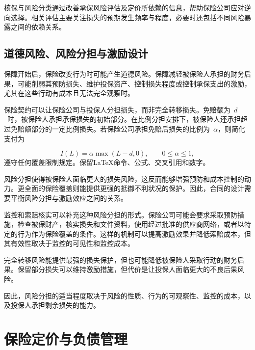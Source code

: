 核保与风险分类通过改善承保风险评估及定价所依赖的信息，帮助保险公司应对逆向选择。相关评估主要关注损失的预期发生频率与程度，必要时还包括不同风险暴露之间的依赖关系。

\subsection{道德风险、风险分担与激励设计}

保障开始后，保险改变行为时可能产生道德风险。保障减轻被保险人承担的财务后果，可能削弱其预防损失、维护投保资产、控制损失程度或控制承保支出的激励，尤其在这些行动有成本且无法完全观察时。

保险契约可以让保险公司与投保人分担损失，而非完全转移损失。免赔额为~$d$~时，被保险人承担承保损失的初始部分。在比例分担安排下，被保险人还承担超过免赔额部分的一定比例损失。若保险公司承担免赔后损失的比例为~$\alpha$，则简化支付为


\begin{equation}
I(L)
=\alpha\max(L-d,0),
\qquad 0\leq\alpha\leq 1,
\label{eq:ch15-coinsurance-payoff}
\end{equation}
遵守任何覆盖限制规定。保留LaTeX命令、公式、交叉引用和数字。

风险分担使得被保险人面临更大的损失风险，这反而能够增强预防和成本控制的动力。更全面的保险覆盖则能提供更强的抵御不利状况的保护。因此，合同的设计需要平衡风险分担与激励效应之间的关系。

监控和索赔核实可以补充这种风险分担的形式。保险公司可能会要求采取预防措施，检查被保财产，核实损失和文件资料，使用经过批准的供应商网络，或者以特定的行为作为保险覆盖的条件。这样的机制可以提高激励效果并降低索赔成本，但其有效性取决于监控的可见性和监控成本。

\begin{tcolorbox}[
enhanced,
breakable,
colback=white,
colframe=FinanceBlue,
boxrule=0.7pt,
sharp corners,
borderline west={2.2pt}{0pt}{FinanceBlue},
title=\textbf{财务前景：报道的广度可能会削弱激励措施的效果。},
coltitle=white,
colbacktitle=FinanceBlue,
fonttitle=\bfseries,
before skip=1.2em,
after skip=1.2em
]

完全转移风险能提供最强的损失保护，但也可能降低被保险人采取行动的财务后果。保留部分损失可以维持激励措施，但代价是让投保人面临更大的不良后果风险。

因此，风险分担的适当程度取决于风险的性质、行为的可观察性、监控的成本，以及投保人承担剩余损失的能力。

\end{tcolorbox}


\section{保险定价与负债管理}

